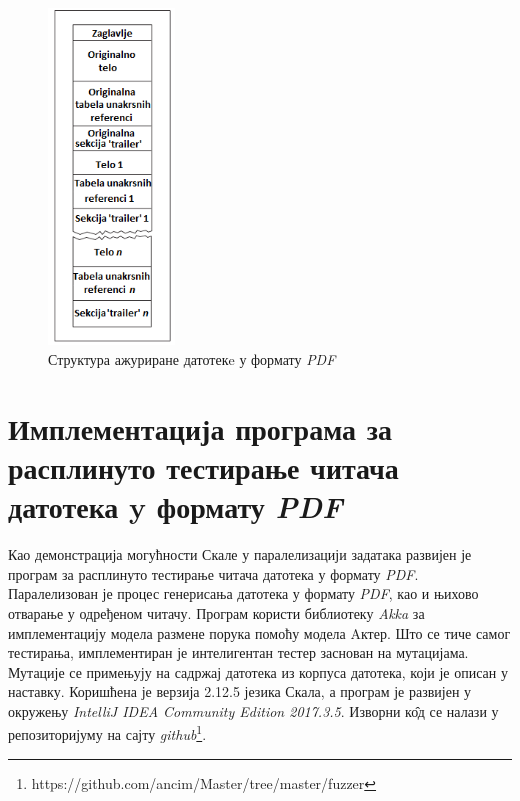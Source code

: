 \documentclass[12pt,oneside]{memoir}
\begin{document}
\begin{figure}[t!]
\centering
\includegraphics[width=0.3\textwidth]{pdfStruktura2.png}
\caption{Структура ажуриране датотекe у формату \textit{PDF}}
\label{fig:pdfStruktura2}
\end{figure}

\chapter{Имплементација програма за расплинуто тестирање читача датотека y формату \textit{PDF}}
\label{chp:implementacija}

Као демонстрација могућности Скале у паралелизацији задатака развијен је програм за расплинуто тестирање читача датотека у формату \textit{PDF}. Паралелизован је процес генерисања датотека у формату \textit{PDF}, као и њихово отварање у одређеном читачу. Програм користи библиотеку \textit{Akka} за имплементацију модела размене порука помоћу модела Aктер. Што се тиче самог тестирања, имплементиран је интелигентан тестер заснован на мутацијама. Мутације се примењују на садржај датотека из корпуса датотека, који је описан у наставку. Коришћена је верзија 2.12.5 језика Скала, а програм је развијен у окружењу \textit{IntelliJ IDEA Community Edition 2017.3.5}. Изворни к\^{о}д се налази у репозиторијуму на сајту \textit{github}\footnote{https://github.com/ancim/Master/tree/master/fuzzer}.
\end{document}
